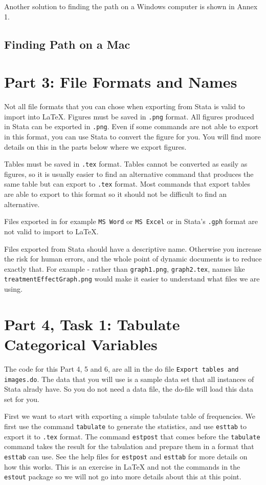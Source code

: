 \documentclass[]{article}
\begin{document}
Another solution to finding the path on a Windows computer is shown in Annex 1.
	
\subsection*{Finding Path on a Mac}


\section*{Part 3: File Formats and Names}
Not all file formats that you can chose when exporting from Stata is valid to import into {\LaTeX}. Figures must be saved in \texttt{.png} format. All figures produced in Stata can be exported in \texttt{.png}. Even if some commands are not able to export in this format, you can use Stata to convert the figure for you. You will find more details on this in the parts below where we export figures. 

Tables must be saved in \texttt{.tex} format. Tables cannot be converted as easily as figures, so it is usually easier to find an alternative command that produces the same table but can export to \texttt{.tex} format. Most commands that export tables are able to export to this format so it should not be difficult to find an alternative.

Files exported in for example \texttt{MS Word} or \texttt{MS Excel} or in Stata's \texttt{.gph} format are not valid to import to {\LaTeX}.

Files exported from Stata should have a descriptive name. Otherwise you increase the risk for human errors, and the whole point of dynamic documents is to reduce exactly that. For example - rather than \texttt{graph1.png}, \texttt{graph2.tex}, names like \texttt{treatmentEffectGraph.png} would make it easier to understand what files we are using.

\section*{Part 4, Task 1: Tabulate Categorical Variables}

The code for this Part 4, 5 and 6, are all in the do file \texttt{Export tables and images.do}. The data that you will use is a sample data set that all instances of Stata alrady have. So you do not need a data file, the do-file will load this data set for you.

First we want to start with exporting a simple tabulate table of frequencies. We first use the command \texttt{tabulate} to generate the statistics, and use \texttt{esttab} to export it to \texttt{.tex} format. The command \texttt{estpost} that comes before the \texttt{tabulate} command takes the result for the tabulation and prepare them in a format that \texttt{esttab} can use. See the help files for \texttt{estpost} and \texttt{esttab} for more details on how this works. This is an exercise in {\LaTeX} and not the commands in the \texttt{estout} package so we will not go into more details about this at this point. 
\end{document}
